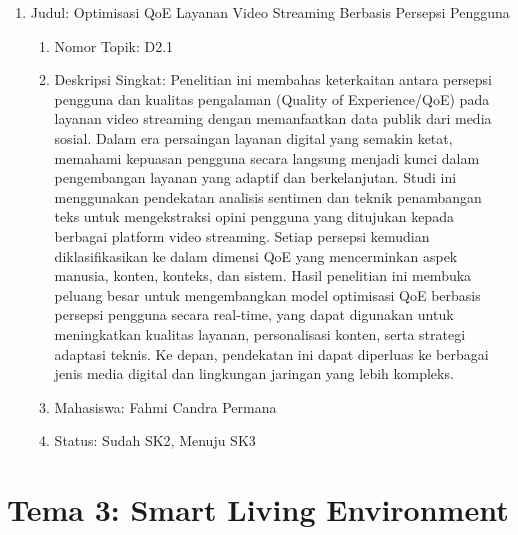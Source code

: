 \documentclass[
  letterpaper,
  DIV=11,
  numbers=noendperiod]{scrreprt}
\begin{document}
\begin{enumerate}
\def\labelenumi{\arabic{enumi}.}
\item
  Judul: Optimisasi QoE Layanan Video Streaming Berbasis Persepsi
  Pengguna

  \begin{enumerate}
  \def\labelenumii{\arabic{enumii}.}
  \item
    Nomor Topik: D2.1
  \item
    Deskripsi Singkat: Penelitian ini membahas keterkaitan antara
    persepsi pengguna dan kualitas pengalaman (Quality of
    Experience/QoE) pada layanan video streaming dengan memanfaatkan
    data publik dari media sosial. Dalam era persaingan layanan digital
    yang semakin ketat, memahami kepuasan pengguna secara langsung
    menjadi kunci dalam pengembangan layanan yang adaptif dan
    berkelanjutan. Studi ini menggunakan pendekatan analisis sentimen
    dan teknik penambangan teks untuk mengekstraksi opini pengguna yang
    ditujukan kepada berbagai platform video streaming. Setiap persepsi
    kemudian diklasifikasikan ke dalam dimensi QoE yang mencerminkan
    aspek manusia, konten, konteks, dan sistem. Hasil penelitian ini
    membuka peluang besar untuk mengembangkan model optimisasi QoE
    berbasis persepsi pengguna secara real-time, yang dapat digunakan
    untuk meningkatkan kualitas layanan, personalisasi konten, serta
    strategi adaptasi teknis. Ke depan, pendekatan ini dapat diperluas
    ke berbagai jenis media digital dan lingkungan jaringan yang lebih
    kompleks.
  \item
    Mahasiswa: Fahmi Candra Permana
  \item
    Status: Sudah SK2, Menuju SK3
  \end{enumerate}
\end{enumerate}

\section{Tema 3: Smart Living
Environment}\label{tema-3-smart-living-environment-1}
\end{document}
